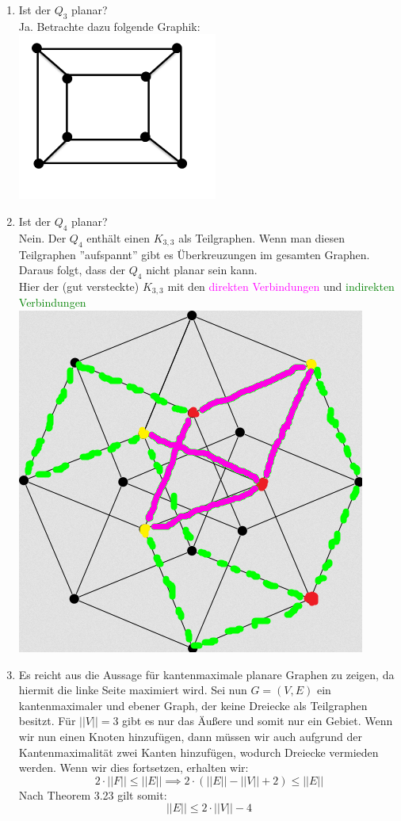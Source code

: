 \begin{enumerate}[label=(\alph*)]
        \item Ist der $Q_3$ planar? \\
        Ja. Betrachte dazu folgende Graphik:\\
        \includegraphics[width=0.3\linewidth]{Q3}
        
        \item Ist der $Q_4$ planar?\\
        Nein. Der $Q_4$ enthält einen $K_{3,3}$ als Teilgraphen. Wenn man diesen Teilgraphen ''aufspannt'' 
        gibt es Überkreuzungen im gesamten Graphen. Daraus folgt, dass der $Q_4$ nicht planar sein kann. \\
        Hier der (gut versteckte) $K_{3,3}$ mit den \textcolor{magenta}{direkten Verbindungen} und 
        \textcolor{green}{indirekten Verbindungen} \\ 
        \includegraphics[width=0.3\linewidth]{Q4}
        
        \item Es reicht aus die Aussage für kantenmaximale planare Graphen zu zeigen, da hiermit die 
        linke Seite maximiert wird. Sei nun $G=(V,E)$ ein kantenmaximaler und ebener Graph, der keine 
        Dreiecke als Teilgraphen besitzt. Für $||V||=3$ gibt es nur das Äußere und somit nur ein Gebiet. 
        Wenn wir nun einen Knoten hinzufügen, dann müssen wir auch aufgrund der Kantenmaximalität zwei 
        Kanten hinzufügen, wodurch Dreiecke vermieden werden.  Wenn wir dies fortsetzen, erhalten wir:
        $$ 2 \cdot ||F|| \le ||E||\implies 2 \cdot \left(||E|| - ||V|| + 2 \right) \le ||E||$$
        Nach Theorem 3.23 gilt somit:
        $$||E|| \le 2 \cdot ||V|| - 4 $$ 
        

\end{enumerate}
